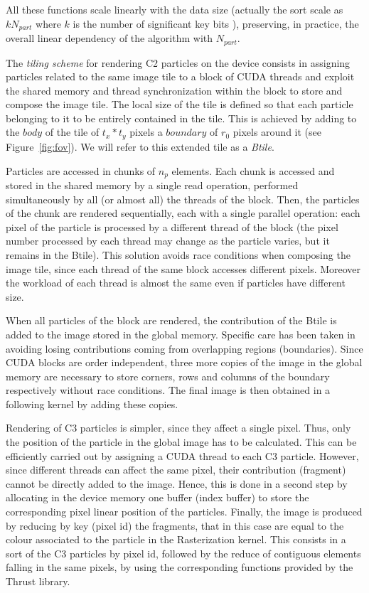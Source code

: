 \documentclass[11pt]{article}
\begin{document}
All these functions scale linearly with the data size (actually the sort scale 
as $kN_{part}$ where $k$ is the number of significant key bits \cite{RadixSort}),
preserving, in practice, the overall linear dependency of the algorithm with $N_{part}$.

The \textit{tiling scheme} for rendering C2 particles on the device consists in 
assigning particles related to the same image tile to a block of CUDA threads 
and exploit the shared memory and thread synchronization within the block to store 
and compose the image tile. The local size of the tile is defined so that each particle 
belonging to it to be entirely contained in the tile. This is achieved by 
adding to the $body$ of the tile of $t_x*t_y$ pixels a $boundary$ of $r_0$ pixels around it (see Figure~\ref{fig:fov}). We will refer to this extended tile as a \textit{Btile}.

Particles are accessed in chunks of $n_p$ elements. Each chunk is accessed and stored 
in the shared memory by a single read operation, performed simultaneously by all (or almost all) the threads of the block. Then, the particles of the chunk are rendered sequentially, each with a single parallel operation: each pixel of the particle is processed by a different thread of the block (the pixel number processed by each thread may change as the particle varies, but it remains in the Btile). 
This solution avoids race conditions when composing the image tile, since each 
thread of the same block accesses different pixels. Moreover the workload of each 
thread is almost the same even if particles have different size.

When all particles of the block are rendered, the contribution of the Btile 
is added to the image stored in the global memory. 
Specific care has been taken in avoiding losing contributions coming 
from overlapping regions (boundaries). Since CUDA blocks are order independent, three more copies of the image in the global memory are necessary to store corners, rows and columns of the boundary respectively without race conditions. The final image is then obtained in a following kernel by adding these copies.

Rendering of C3 particles is simpler, since they affect a single pixel. 
Thus, only the position of the particle in the global image has to be calculated.
This can be efficiently carried out by assigning a CUDA thread to each C3 particle. 
However, since different threads can affect the same pixel, their contribution (fragment) cannot be directly added to the image. Hence, this is done in a second step by allocating in the device memory one buffer (index buffer) to store the corresponding pixel linear position of the particles. Finally, the image is produced by reducing by key (pixel id) the fragments, that in this case are equal to the colour associated to the particle in the Rasterization kernel. This consists in a sort of the C3 particles by pixel id, followed by the reduce of 
contiguous elements falling in the same pixels, by using the corresponding 
functions provided by the Thrust library.
\end{document}
